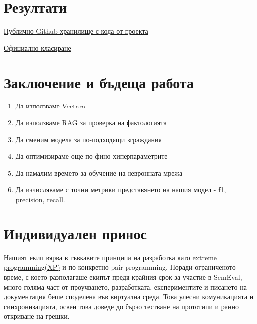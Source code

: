 \documentclass[12pt]{article}
\begin{document}
	\section{Резултати}
	
	\href{https://github.com/Kr1s1m/SemEval-2025_Task-3/}{Публично Github хранилище с кода от проекта}
	
	\linebreak 
	\href{https://mushroomeval.pythonanywhere.com/submission/}{Официално класиране}
	
	\section{Заключение и бъдеща работа}
	
	\begin{enumerate}    
		\item[\textbullet] Да използваме Vectara  
		\item[\textbullet] Да използваме RAG за проверка на фактологията
		\item[\textbullet] Да сменим модела за по-подходящи вграждания
		\item[\textbullet] Да оптимизираме още по-фино хиперпараметрите
		\item[\textbullet] Да намалим времето за обучение на невронната мрежа
		\item[\textbullet] Да изчисляваме с точни метрики представянето на нашия модел - f1, precision, recall.

	\end{enumerate}

	\section{Индивидуален принос}
	
	Нашият екип вярва в гъвкавите принципи на разработка като  \href{https://asana.com/resources/extreme-programming-xp}{extreme programming(XP)} и по конкретно pair programming. Поради ограниченото време, с което разполагаше екипът преди крайния срок за участие в SemEval, много голяма част от проучването, разработката, експериментите и писането на документация беше споделена във виртуална среда. Това улесни комуникацията и синхронизацията, освен това доведе до бързо тестване на прототипи и ранно откриване на грешки.
	
\end{document}
